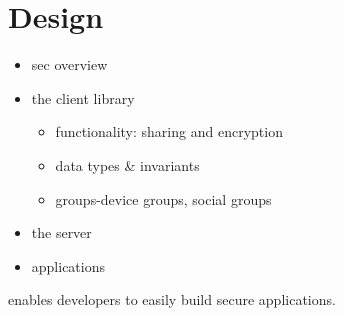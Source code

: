 \section{Design}

\begin{itemize}
    \item sec overview
    \item the \name{} client library
        \begin{itemize}
        \item functionality: sharing and encryption
        \item data types \& invariants
        \item groups-device groups, social groups
        \end{itemize}
    \item the \name{} server
    \item \name{} applications
\end{itemize}


\name{} enables developers to easily build secure applications. 

